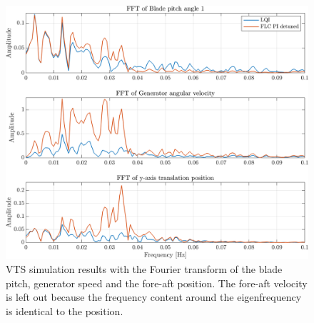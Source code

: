 \begin{figure}[h]
	\centering
	\includegraphics[width=0.63\linewidth]{Graphics/TestResults/VTSplotting/11_fft_th_w_py.png}
	\caption{VTS simulation results with the Fourier transform of the blade pitch, generator speed and the fore-aft position. The fore-aft velocity is left out because the frequency content around the eigenfrequency is identical to the position.}
	\label{fig:vts_11_fft_th_w_py_vy}
\end{figure}


